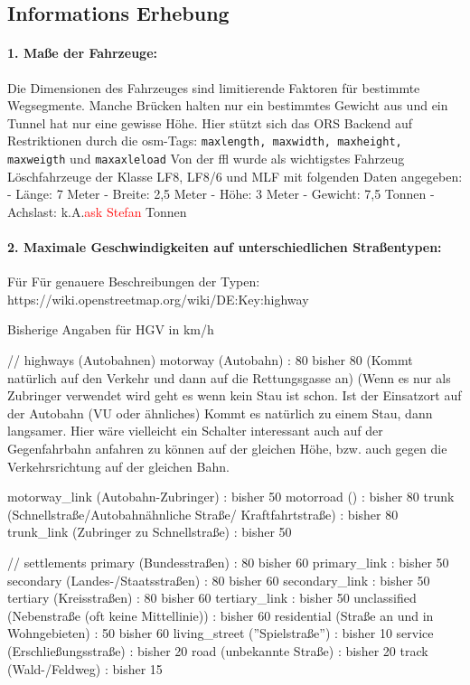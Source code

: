 \documentclass[12pt,a4paper]{article}
\newcommand\todo[1]{\textcolor{red}{#1}}
\begin{document}
\subsection{Informations Erhebung}

\paragraph*{1. Maße der Fahrzeuge:} Die Dimensionen des Fahrzeuges sind limitierende Faktoren für bestimmte Wegsegmente. Manche Brücken halten nur ein bestimmtes Gewicht aus und ein Tunnel hat nur eine gewisse Höhe. Hier stützt sich das ORS Backend auf Restriktionen durch die \gls{osm}-Tags: \lstinline!maxlength, maxwidth, maxheight, maxweigth! und \lstinline!maxaxleload! Von der \gls{ffl} wurde als wichtigstes Fahrzeug Löschfahrzeuge der Klasse LF8, LF8/6 und MLF mit folgenden Daten angegeben:
- Länge: 7 Meter
- Breite: 2,5 Meter
- Höhe: 3 Meter
- Gewicht: 7,5 Tonnen
- Achslast: k.A.\todo{ask Stefan} Tonnen 

\paragraph*{2. Maximale Geschwindigkeiten auf unterschiedlichen Straßentypen:} 
Für 
Für genauere Beschreibungen der Typen: https://wiki.openstreetmap.org/wiki/DE:Key:highway

Bisherige Angaben für HGV in km/h

// highways (Autobahnen)
motorway (Autobahn) : 80 bisher 80 (Kommt natürlich auf den Verkehr und dann auf die Rettungsgasse an) (Wenn es nur als Zubringer verwendet wird geht es wenn kein Stau ist schon. Ist der Einsatzort auf der Autobahn (VU oder ähnliches) Kommt es natürlich zu einem Stau, dann langsamer. Hier wäre vielleicht ein Schalter interessant auch auf der Gegenfahrbahn anfahren zu können auf der gleichen Höhe, bzw. auch gegen die Verkehrsrichtung auf der gleichen Bahn.

motorway\_link (Autobahn-Zubringer)  : bisher 50
motorroad () : bisher 80
trunk (Schnellstraße/Autobahnähnliche Straße/ Kraftfahrtstraße)  : bisher 80
trunk\_link (Zubringer zu Schnellstraße) : bisher 50

// settlements
primary (Bundesstraßen) : 80 bisher 60
primary\_link  : bisher 50
secondary (Landes-/Staatsstraßen) : 80 bisher 60
secondary\_link  : bisher 50
tertiary (Kreisstraßen) : 80 bisher 60
tertiary\_link  : bisher 50
unclassified (Nebenstraße (oft keine Mittellinie))  : bisher 60
residential (Straße an und in Wohngebieten) : 50 bisher 60
living\_street (''Spielstraße'')  : bisher 10
service (Erschließungsstraße) : bisher 20
road (unbekannte Straße) : bisher 20
track (Wald-/Feldweg) : bisher 15
\end{document}
